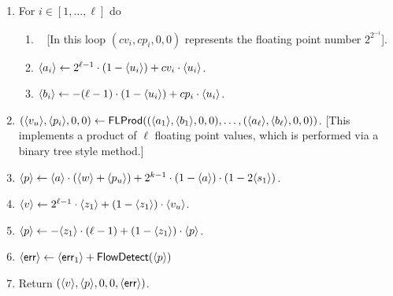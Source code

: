 \begin{enumerate}
  \item For $i \in [1,\ldots,\ell]$ do
        \begin{enumerate}
          \item~ [In this loop $(cv_i,cp_i,0,0)$ represents the floating point number $2^{2^{-i}}$].
          \item $\langle a_i \rangle \leftarrow 2^{\ell-1} \cdot (1-\langle u_i \rangle)+cv_i \cdot \langle u_i \rangle$.
          \item $\langle b_i \rangle \leftarrow -(\ell-1) \cdot (1-\langle u_i \rangle)+cp_i \cdot \langle u_i \rangle$.
        \end{enumerate}
  \item $(\langle v_u \rangle,\langle p_i \rangle,0,0)
          \leftarrow \mathsf{FLProd}((\langle a_1 \rangle,\langle b_1 \rangle,0,0), \ldots,
          (\langle a_\ell \rangle,\langle b_\ell \rangle,0,0))$.
          [This implements a product of $\ell$ floating point values, which is
            performed via a binary tree style method.]
  \item $\langle p \rangle \leftarrow \langle a \rangle \cdot (\langle w \rangle+\langle p_u \rangle)
          +2^{k-1}\cdot (1-\langle a \rangle) \cdot (1-2 \langle s_1 \rangle)$.
  \item $\langle v \rangle \leftarrow 2^{\ell-1} \cdot \langle z_1 \rangle+(1-\langle z_1 \rangle) \cdot \langle v_u \rangle$.
  \item $\langle p \rangle \leftarrow -\langle z_1 \rangle \cdot (\ell-1)
          +(1-\langle z_1 \rangle) \cdot \langle p \rangle$.
  \item $\langle \mathsf{err} \rangle \leftarrow \langle \mathsf{err}_1 \rangle +  \mathsf{FlowDetect}(\langle p \rangle)$
  \item Return $(\langle v \rangle,\langle p \rangle,0,0,\langle \mathsf{err} \rangle)$.
\end{enumerate}


